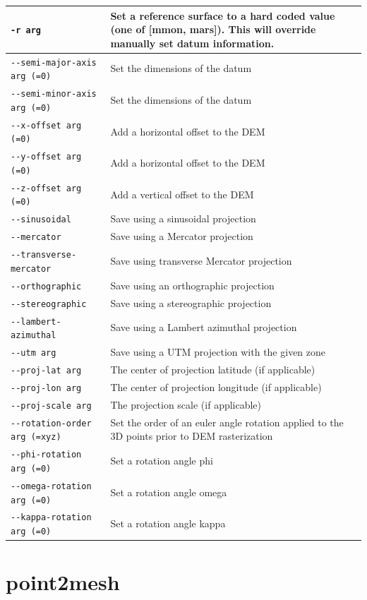 \begin{longtable}{|l|p{10cm}|}
\verb#-r arg# & Set a reference surface to a hard coded value (one of [mmon, mars]). This will override manually set datum information. \\ \hline
\verb#--semi-major-axis arg (=0)# & Set the dimensions of the datum \\ \hline
\verb#--semi-minor-axis arg (=0)# & Set the dimensions of the datum \\ \hline
\verb#--x-offset arg (=0)# & Add a horizontal offset to the DEM \\ \hline
\verb#--y-offset arg (=0)# & Add a horizontal offset to the DEM \\ \hline
\verb#--z-offset arg (=0)# & Add a vertical offset to the DEM \\ \hline
\verb#--sinusoidal# & Save using a sinusoidal projection \\ \hline
\verb#--mercator# & Save using a Mercator projection \\ \hline
\verb#--transverse-mercator# & Save using transverse Mercator projection \\ \hline
\verb#--orthographic# & Save using an orthographic projection \\ \hline
\verb#--stereographic# & Save using a stereographic projection \\ \hline
\verb#--lambert-azimuthal# & Save using a Lambert azimuthal projection \\ \hline
\verb#--utm arg# & Save using a UTM projection with the given zone \\ \hline
\verb#--proj-lat arg# & The center of projection latitude (if applicable) \\ \hline
\verb#--proj-lon arg# & The center of projection longitude (if applicable) \\ \hline
\verb#--proj-scale arg# & The projection scale (if applicable) \\ \hline
\verb#--rotation-order arg (=xyz)# & Set the order of an euler angle rotation applied to the 3D points prior to DEM rasterization \\ \hline
\verb#--phi-rotation arg (=0)# & Set a rotation angle phi \\ \hline
\verb#--omega-rotation arg (=0)# & Set a rotation angle omega \\ \hline
\verb#--kappa-rotation arg (=0)# & Set a rotation angle kappa \\ \hline
\end{longtable}

\section{point2mesh}
\label{point2mesh}

